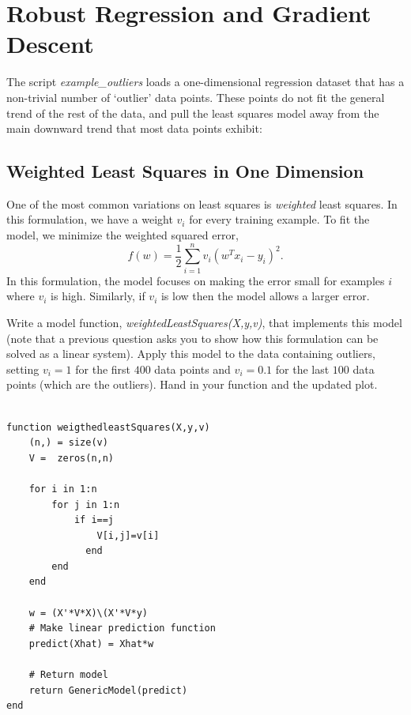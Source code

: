 \documentclass{article}
\def\blu#1{{\color{blu}#1}}
\newcommand{\centerfig}[2]{\begin{center}\texttt{[image: a2f/\#2]}\end{center}}
\begin{document}
\section{Robust Regression and Gradient Descent}

The script \emph{example\_outliers} loads a one-dimensional regression dataset that has a non-trivial number of `outlier' data points. These points do not fit the general trend of the rest of the data, and pull the least squares model away from the main downward trend that most data points exhibit:




\subsection{Weighted Least Squares in One Dimension}

One of the most common variations on least squares is \emph{weighted} least squares. In this formulation, we have a weight $v_i$ for every training example. To fit the model, we minimize the weighted squared error,
\[
f(w) =  \frac{1}{2}\sum_{i=1}^n v_i(w^Tx_i - y_i)^2.
\]
In this formulation, the model focuses on making the error small for examples $i$ where $v_i$ is high. Similarly, if $v_i$ is low then the model allows a larger error.

Write a model function, \emph{weightedLeastSquares(X,y,v)}, that implements this model (note that a previous question asks you to show how this formulation can be solved as a linear system).
Apply this model to the data containing outliers, setting $v_i = 1$ for the first $400$ data points and $v_i = 0.1$ for the last $100$ data points (which are the outliers). \blu{Hand in your function and the updated plot}.


  \begin{verbatim}

function weigthedleastSquares(X,y,v)
    (n,) = size(v)
    V =  zeros(n,n)
     
    for i in 1:n
        for j in 1:n
            if i==j
                V[i,j]=v[i]
              end 
        end
    end
    
    w = (X'*V*X)\(X'*V*y)
    # Make linear prediction function
    predict(Xhat) = Xhat*w

    # Return model
    return GenericModel(predict)
end

  \end{verbatim}
\end{document}
